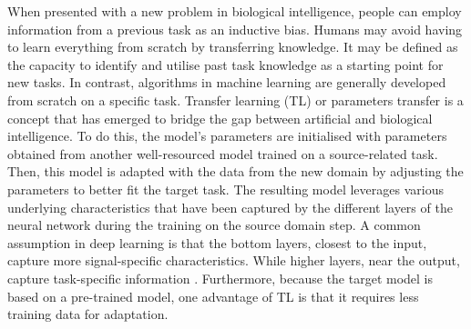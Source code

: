 When presented with a new problem in biological intelligence, people can employ information from a previous task as an inductive bias. Humans may avoid having to learn everything from scratch by transferring knowledge. It may be defined as the capacity to identify and utilise past task knowledge as a starting point for new tasks. In contrast, algorithms in machine learning are generally developed from scratch on a specific task. Transfer learning (TL) or parameters transfer is a concept that has emerged to bridge the gap between artificial and biological intelligence. To do this, the model's parameters are initialised with parameters obtained from another well-resourced model trained on a source-related task. Then, this model is adapted with the data from the new domain by adjusting the parameters to better fit the target task.
The resulting model leverages various underlying characteristics that have been captured by the different layers of the neural network during the training on the source domain step.
A common assumption in deep learning is that the bottom layers, closest to the input, capture more signal-specific characteristics. While higher layers, near the output, capture task-specific information \cite{tfbased,yosinski2014transferable}. 
Furthermore, because the target model is based on a pre-trained model, one advantage of TL is that it requires less training data for adaptation.

